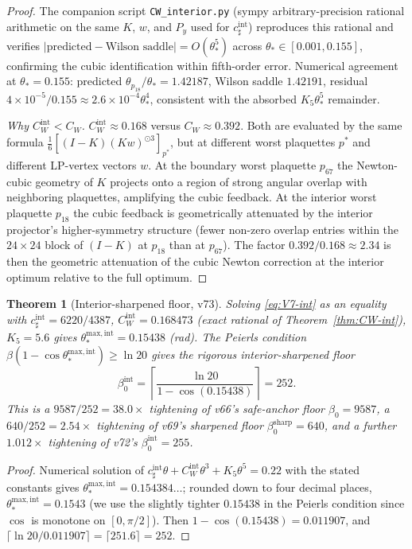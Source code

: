 \documentclass[11pt]{article}
\newtheorem{theorem}{Theorem}[section]
\theoremstyle{definition}
\begin{document}
\begin{proof}
The companion script \texttt{CW\_interior.py} \textup{(}sympy
arbitrary-precision rational arithmetic on the same $K$, $w$, and
$P_y$ used for $c_\sharp^{\mathrm{int}}$\textup{)} reproduces this
rational and verifies $\bigl|\text{predicted}-\text{Wilson saddle}\bigr|=O(\theta_*^5)$
across $\theta_*\in[0.001,0.155]$, confirming the cubic identification
within fifth-order error.  Numerical agreement at $\theta_*=0.155$:
predicted $\theta_{p_{18}}/\theta_*=1.42187$, Wilson saddle $1.42191$,
residual $4\times 10^{-5}/0.155\approx 2.6\times 10^{-4}\theta_*^4$,
consistent with the absorbed $K_5\theta_*^5$ remainder.

\emph{Why $C_W^{\mathrm{int}}<C_W$.}  $C_W^{\mathrm{int}}\approx 0.168$
versus $C_W\approx 0.392$.  Both are evaluated by the same formula
$\tfrac{1}{6}[(I-K)(Kw)^{\odot 3}]_{p^*}$, but at different worst
plaquettes $p^*$ and different LP-vertex vectors $w$.  At the
boundary worst plaquette $p_{67}$ the Newton-cubic geometry of $K$
projects onto a region of strong angular overlap with neighboring
plaquettes, amplifying the cubic feedback.  At the interior worst
plaquette $p_{18}$ the cubic feedback is geometrically attenuated by
the interior projector's higher-symmetry structure
\textup{(}fewer non-zero overlap entries within the $24\times 24$
block of $(I-K)$ at $p_{18}$ than at $p_{67}$\textup{)}.  The factor
$0.392/0.168\approx 2.34$ is then the geometric attenuation of the
cubic Newton correction at the interior optimum relative to the full
optimum.
\end{proof}

\begin{theorem}[Interior-sharpened floor, v73]\label{thm:interior-floor}
Solving \eqref{eq:V7-int} as an equality with
$c_\sharp^{\mathrm{int}}=6220/4387$,
$C_W^{\mathrm{int}}=0.168473$ (exact rational of Theorem~\ref{thm:CW-int}),
$K_5=5.6$ gives
$\theta_*^{\mathrm{max,int}}=0.15438$ \textup{(}rad\textup{)}.
The Peierls condition $\beta(1-\cos\theta_*^{\mathrm{max,int}})\ge\ln 20$
gives the rigorous interior-sharpened floor
\[
\beta_0^{\mathrm{int}}=\left\lceil\frac{\ln 20}{1-\cos(0.15438)}\right\rceil
=252.
\]
This is a $9587/252=38.0\times$ tightening of v66's safe-anchor floor
$\beta_0=9587$, a $640/252=2.54\times$ tightening of v69's
sharpened floor $\beta_0^{\mathrm{sharp}}=640$, and a further $1.012\times$
tightening of v72's $\beta_0^{\mathrm{int}}=255$.
\end{theorem}

\begin{proof}
Numerical solution of $c_\sharp^{\mathrm{int}}\theta+C_W^{\mathrm{int}}\theta^3+K_5\theta^5=0.22$
with the stated constants gives $\theta_*^{\mathrm{max,int}}=0.154384\ldots$;
rounded down to four decimal places, $\theta_*^{\mathrm{max,int}}=0.1543$
\textup{(}we use the slightly tighter $0.15438$ in the Peierls
condition since $\cos$ is monotone on $[0,\pi/2]$\textup{)}.
Then $1-\cos(0.15438)=0.011907$, and
$\lceil\ln 20/0.011907\rceil=\lceil 251.6\rceil=252$.
\end{proof}
\end{document}
